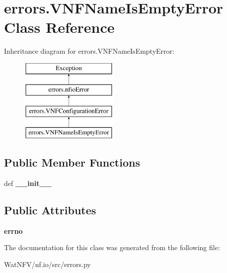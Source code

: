 \hypertarget{classerrors_1_1VNFNameIsEmptyError}{\section{errors.\-V\-N\-F\-Name\-Is\-Empty\-Error Class Reference}
\label{classerrors_1_1VNFNameIsEmptyError}
}
Inheritance diagram for errors.\-V\-N\-F\-Name\-Is\-Empty\-Error\-:\begin{figure}[H]
\begin{center}
\leavevmode
\includegraphics[height=4.000000cm]{classerrors_1_1VNFNameIsEmptyError}
\end{center}
\end{figure}
\subsection*{Public Member Functions}
\begin{DoxyCompactItemize}
\item 
\hypertarget{classerrors_1_1VNFNameIsEmptyError_ae551ab48dee839aa8e2a35b43801e1f9}{def {\bfseries \-\_\-\-\_\-init\-\_\-\-\_\-}}\label{classerrors_1_1VNFNameIsEmptyError_ae551ab48dee839aa8e2a35b43801e1f9}

\end{DoxyCompactItemize}
\subsection*{Public Attributes}
\begin{DoxyCompactItemize}
\item 
\hypertarget{classerrors_1_1VNFNameIsEmptyError_a6c69f18aa91b91ffb8b2483d1e1c4dba}{{\bfseries errno}}\label{classerrors_1_1VNFNameIsEmptyError_a6c69f18aa91b91ffb8b2483d1e1c4dba}

\end{DoxyCompactItemize}


The documentation for this class was generated from the following file\-:\begin{DoxyCompactItemize}
\item 
Wat\-N\-F\-V/nf.\-io/src/errors.\-py\end{DoxyCompactItemize}
